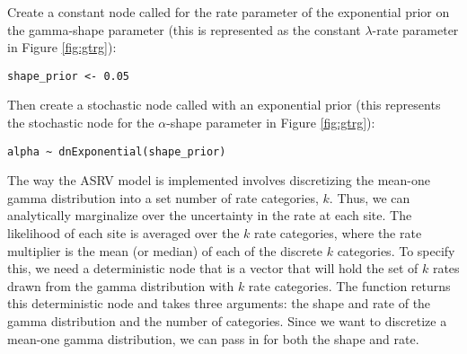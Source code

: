 Create a constant node called  for the rate parameter of the exponential prior on the gamma-shape parameter (this is represented as the constant $\lambda$-rate parameter in Figure \ref{fig:gtrg}):
{\tt\begin{snugshade*}
\begin{lstlisting}
shape_prior <- 0.05                                                                             
\end{lstlisting}
\end{snugshade*}}

Then create a stochastic node called  with an exponential prior (this represents the stochastic node for the $\alpha$-shape parameter in Figure \ref{fig:gtrg}):
{\tt\begin{snugshade*}
\begin{lstlisting}
alpha ~ dnExponential(shape_prior)
\end{lstlisting}
\end{snugshade*}}

The way the ASRV model is implemented involves discretizing the mean-one gamma distribution into a set number of rate categories, $k$. 
Thus, we can analytically marginalize over the uncertainty in the rate at each site. 
The likelihood of each site is averaged over the $k$ rate categories, where the rate multiplier is the mean (or median) of each of the discrete $k$ categories. 
To specify this, we need a deterministic node that is a vector that will hold the set of $k$ rates drawn from the gamma distribution with $k$ rate categories. 
The  function returns this deterministic node and takes three arguments: the shape and rate of the gamma distribution and the number of categories. 
Since we want to discretize a mean-one gamma distribution, we can pass in  for both the shape and rate.

